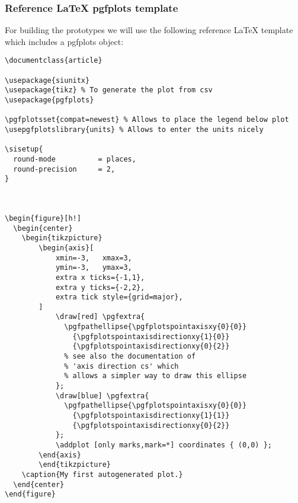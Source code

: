 \subsubsection{Reference LaTeX pgfplots template}
\label{subsec:reference_latex_pgfplots_template}
For building the prototypes we will use the following reference LaTeX template which includes a pgfplots object:~\cite{pgfplots_gallery_sourceforge}

\begin{lstlisting}[caption={Reference LaTeX template with a pgfplots object},label={lst:reference_latex_pgfplots_template},language={[LaTeX]{TeX}}]
\documentclass{article}

\usepackage{siunitx}
\usepackage{tikz} % To generate the plot from csv
\usepackage{pgfplots}

\pgfplotsset{compat=newest} % Allows to place the legend below plot
\usepgfplotslibrary{units} % Allows to enter the units nicely

\sisetup{
  round-mode          = places,
  round-precision     = 2,
}



\begin{figure}[h!]
  \begin{center}
    \begin{tikzpicture}
        \begin{axis}[
            xmin=-3,   xmax=3,
            ymin=-3,   ymax=3,
            extra x ticks={-1,1},
            extra y ticks={-2,2},
            extra tick style={grid=major},
        ]
            \draw[red] \pgfextra{
              \pgfpathellipse{\pgfplotspointaxisxy{0}{0}}
                {\pgfplotspointaxisdirectionxy{1}{0}}
                {\pgfplotspointaxisdirectionxy{0}{2}}
              % see also the documentation of
              % 'axis direction cs' which
              % allows a simpler way to draw this ellipse
            };
            \draw[blue] \pgfextra{
              \pgfpathellipse{\pgfplotspointaxisxy{0}{0}}
                {\pgfplotspointaxisdirectionxy{1}{1}}
                {\pgfplotspointaxisdirectionxy{0}{2}}
            };
            \addplot [only marks,mark=*] coordinates { (0,0) };
        \end{axis}
        \end{tikzpicture}
    \caption{My first autogenerated plot.}
  \end{center}
\end{figure}


\end{lstlisting}

